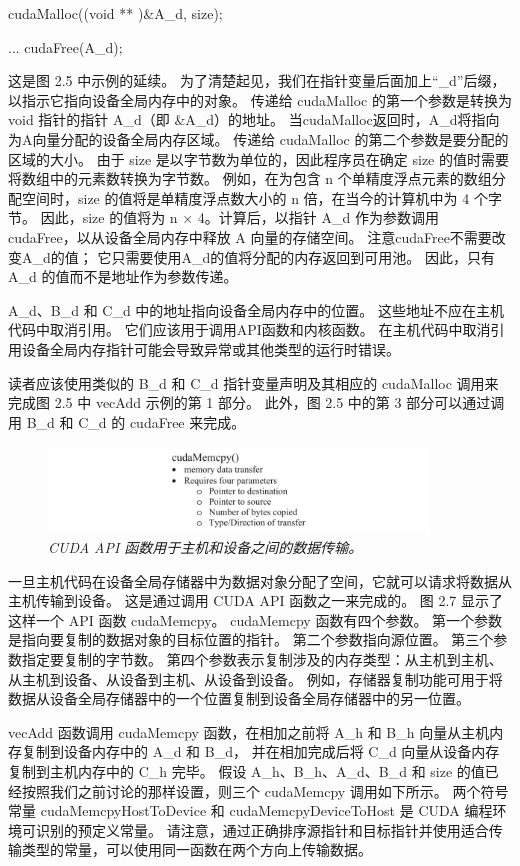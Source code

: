 cudaMalloc((void ** )\&A\_d, size);

... cudaFree(A\_d);

这是图 2.5 中示例的延续。 为了清楚起见，我们在指针变量后面加上“\_d”后缀，以指示它指向设备全局内存中的对象。 
传递给 cudaMalloc 的第一个参数是转换为 void 指针的指针 A\_d（即 \&A\_d）的地址。 
当cudaMalloc返回时，A\_d将指向为A向量分配的设备全局内存区域。 传递给 cudaMalloc 的第二个参数是要分配的区域的大小。 
由于 size 是以字节数为单位的，因此程序员在确定 size 的值时需要将数组中的元素数转换为字节数。 
例如，在为包含 n 个单精度浮点元素的数组分配空间时，size 的值将是单精度浮点数大小的 n 倍，在当今的计算机中为 4 个字节。 
因此，size 的值将为 n × 4。计算后，以指针 A\_d 作为参数调用 cudaFree，以从设备全局内存中释放 A 向量的存储空间。 
注意cudaFree不需要改变A\_d的值； 它只需要使用A\_d的值将分配的内存返回到可用池。 
因此，只有 A\_d 的值而不是地址作为参数传递。

A\_d、B\_d 和 C\_d 中的地址指向设备全局内存中的位置。 这些地址不应在主机代码中取消引用。 
它们应该用于调用API函数和内核函数。 在主机代码中取消引用设备全局内存指针可能会导致异常或其他类型的运行时错误。

读者应该使用类似的 B\_d 和 C\_d 指针变量声明及其相应的 cudaMalloc 调用来完成图 2.5 中 vecAdd 示例的第 1 部分。 
此外，图 2.5 中的第 3 部分可以通过调用 B\_d 和 C\_d 的 cudaFree 来完成。

\begin{figure}[H]
	\centering
	\includegraphics[width=0.9\textwidth]{figs/F2.7.png}
	\caption{\textit{CUDA API 函数用于主机和设备之间的数据传输。}}
\end{figure}

一旦主机代码在设备全局存储器中为数据对象分配了空间，它就可以请求将数据从主机传输到设备。 
这是通过调用 CUDA API 函数之一来完成的。 图 2.7 显示了这样一个 API 函数 cudaMemcpy。 
cudaMemcpy 函数有四个参数。 第一个参数是指向要复制的数据对象的目标位置的指针。 第二个参数指向源位置。 
第三个参数指定要复制的字节数。 第四个参数表示复制涉及的内存类型：从主机到主机、从主机到设备、从设备到主机、从设备到设备。 
例如，存储器复制功能可用于将数据从设备全局存储器中的一个位置复制到设备全局存储器中的另一位置。

vecAdd 函数调用 cudaMemcpy 函数，在相加之前将 A\_h 和 B\_h 向量从主机内存复制到设备内存中的 A\_d 和 B\_d，
并在相加完成后将 C\_d 向量从设备内存复制到主机内存中的 C\_h 完毕。 
假设 A\_h、B\_h、A\_d、B\_d 和 size 的值已经按照我们之前讨论的那样设置，则三个 cudaMemcpy 调用如下所示。 
两个符号常量 cudaMemcpyHostToDevice 和 cudaMemcpyDeviceToHost 是 CUDA 编程环境可识别的预定义常量。 
请注意，通过正确排序源指针和目标指针并使用适合传输类型的常量，可以使用同一函数在两个方向上传输数据。

